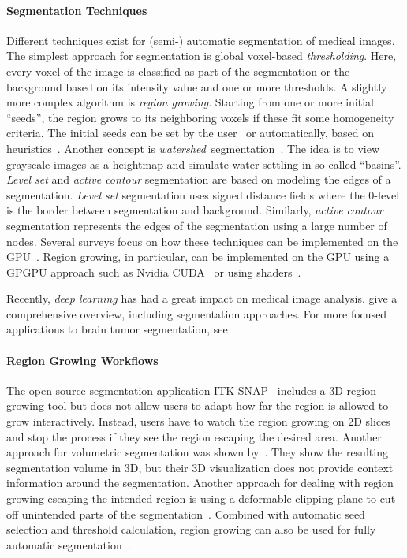 \documentclass[sigconf]{acmart}
\begin{document}
\paragraph{Segmentation Techniques}
Different techniques exist for (semi-) automatic segmentation of medical images.
The simplest approach for segmentation is global voxel-based \emph{thresholding}.
Here, every voxel of the image is classified as part of the segmentation or the background based on its intensity value and one or more thresholds.
A slightly more complex algorithm is \emph{region growing}.
Starting from one or more initial \enquote{seeds}, the region grows to its neighboring voxels if these fit some homogeneity criteria.
The initial seeds can be set by the user~\cite{adams1994seeded} or automatically, based on heuristics~\cite{lin2000unseeded}.
Another concept is \emph{watershed}~segmentation~\cite{vincent1991watershed}.
The idea is to view grayscale images as a heightmap and simulate water settling in so-called \enquote{basins}.
\emph{Level set} and \emph{active contour} segmentation are based on modeling the edges of a segmentation.
\emph{Level set} segmentation uses signed distance fields where the $0$-level is the border between segmentation and background.
Similarly, \emph{active contour} segmentation represents the edges of the segmentation using a large number of nodes.
Several surveys focus on how these techniques can be implemented on the GPU~\cite{eklund2013state_gpu, smistad2015state_gpu, hadwiger2004state_gpu}. Region growing, in particular, can be implemented on the GPU using a GPGPU approach such as Nvidia CUDA~\cite{kalaiselvi2017CUDA_reg_growing} or using shaders~\cite{schenke2005gpu_reg_growing}.

Recently, \emph{deep learning} has had a great impact on medical image analysis. \citeauthor{litjens2017dl} give a comprehensive overview, including segmentation approaches.
For more focused applications to brain tumor segmentation, see \citeauthor{Isensee2019,Zhang2021}.

\paragraph{Region Growing Workflows}
The open-source segmentation application ITK-SNAP~\cite{itk-snap2006} includes a 3D region growing tool but does not allow users to adapt how far the region is allowed to grow interactively.
Instead, users have to watch the region growing on 2D slices and stop the process if they see the region escaping the desired area.
Another approach for volumetric segmentation was shown by~\citeauthor{sherbondy2003simultanious_vis}.
They show the resulting segmentation volume in 3D, but their 3D visualization does not provide context information around the segmentation. 
Another approach for dealing with region growing escaping the intended region is using a deformable clipping plane to cut off unintended parts of the segmentation~\cite{chen2017clipping}.
Combined with automatic seed selection and threshold calculation, region growing can also be used for fully automatic segmentation~\cite{Wantanajittikul2016auto_region_growing}.
\end{document}
